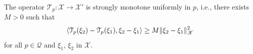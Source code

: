 \begin{lemma}
\label{lemma:monotone-T}
The operator $\mathcal{T}_p\colon\mathscr{X}\to\mathscr{X}'$ is strongly monotone uniformly in $p$, i.e., there exists $M>0$ such that
\[
\langle\mathcal{T}_p(\xi_2)-\mathcal{T}_p(\xi_1),\xi_2-\xi_1\rangle\ge M\lVert\xi_2-\xi_1\rVert_\mathscr{X}^2
\]
for all $p\in\mathscr{Q}$ and $\xi_1$, $\xi_2$ in $\mathscr{X}$.
\end{lemma}
